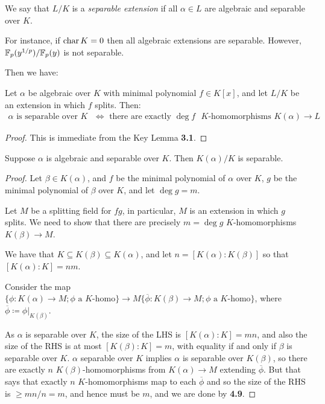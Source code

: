 \documentclass[10pt,a4paper]{article}
\begin{document}
We say that $L/K$ is a \emph{separable extension} if all $\alpha \in L$ are algebraic and separable over $K$.

For instance, if $\operatorname{char} K = 0$ then all algebraic extensions are separable. However, $\mathbb{F}_p(y^{1/p}) / \mathbb{F}_p(y)$ is not separable.

Then we have:
\begin{lemma}
Let $\alpha$ be algebraic over $K$ with minimal polynomial $f \in K[x]$, and let $L/K$ be an extension in which $f$ splits. Then:
\begin{align*}
\alpha \text{ is separable over $K$ } \iff \text{ there are exactly $\deg f$ $K$-homomorphisms $K(\alpha)\to L$}
\end{align*}
\end{lemma}
\begin{proof}
This is immediate from the Key Lemma \textbf{3.1}.
\end{proof}
\begin{proposition}
Suppose $\alpha$ is algebraic and separable over $K$. Then $K(\alpha)/K$ is separable.
\end{proposition}
\begin{proof}
Let $\beta \in K(\alpha)$, and $f$ be the minimal polynomial of $\alpha$ over $K$, $g$ be the minimal polynomial of $\beta$ over $K$, and let $\deg g = m$.

Let $M$ be a splitting field for $fg$, in particular, $M$ is an extension in which $g$ splits. We need to show that there are precisely $m = \deg g$ $K$-homomorphisms $K(\beta)\to M$.

We have that $K\subseteq K(\beta) \subseteq K(\alpha)$, and let $n = [K(\alpha):K(\beta)]$ so that $[K(\alpha):K] = nm$.

Consider the map $\{\phi : K(\alpha)\to M; \phi \text{ a $K$-homo}\} \to M\{\overline{\phi}:K(\beta)\to M; \phi \text{ a $K$-homo}\}$, where $\overline{\phi} \coloneqq \phi|_{K(\beta)}$.

As $\alpha$ is separable over $K$, the size of the LHS is $[K(\alpha):K] = mn$, and also the size of the RHS is at most $[K(\beta):K] = m$, with equality if and only if $\beta$ is separable over $K$. $\alpha$ separable over $K$ implies $\alpha$ is separable over $K(\beta)$, so there are exactly $n$ $K(\beta)$-homomorphisms from $K(\alpha)\to M$ extending $\overline{\phi}$. But that says that exactly $n$ $K$-homomorphisms map to each $\overline{\phi}$ and so the size of the RHS is $\geq mn/n = m$, and hence must be $m$, and we are done by \textbf{4.9}.
\end{proof}
\end{document}
